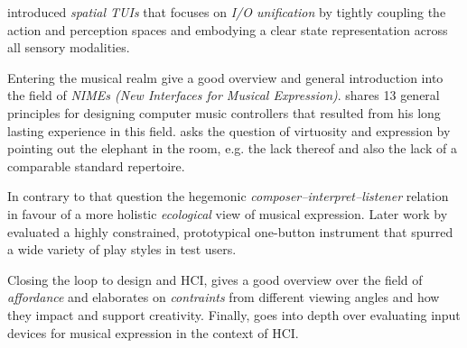 \documentclass[10pt,a4paper]{scrartcl}
\begin{document}
\cite{Sharlin2004} introduced \emph{spatial TUIs} that focuses on \emph{I/O unification} by tightly coupling the action and perception spaces and embodying a clear state representation across all sensory modalities.


Entering the musical realm \cite{Fels2011} give a good overview and general introduction into the field of \emph{NIMEs (New Interfaces for Musical Expression)}. \cite{Cook2001} shares 13 general principles for designing computer music controllers that resulted from his long lasting experience in this field. \cite{Dobrian2006} asks the question of virtuosity and expression by pointing out the elephant in the room, e.g. the lack thereof and also the lack of a comparable standard repertoire. 

In contrary to that \cite{Gurevich2007} question the hegemonic \emph{composer--interpret--listener} relation in favour of a more holistic \emph{ecological} view of musical expression. Later work by \cite{Gurevich2010} evaluated a highly constrained, prototypical one-button instrument that spurred a wide variety of play styles in test users.

Closing the loop to design and HCI, \cite{Magnusson2010} gives a good overview over the field of \emph{affordance} and elaborates on \emph{contraints} from different viewing angles and how they impact and support creativity. Finally, \cite{Wanderley2002} goes into depth over evaluating input devices for musical expression in the context of HCI. 










\end{document}
